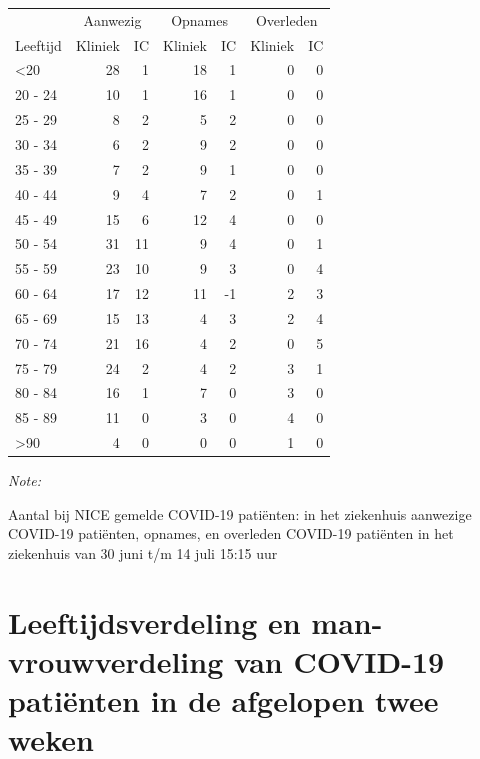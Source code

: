 \documentclass[
  english,
  man,floatsintext]{apa6}
\begin{document}
\begin{table}
\centering\begingroup\fontsize{10}{12}\selectfont

\begin{threeparttable}
\begin{tabular}{lrrrrrr}
\toprule
\multicolumn{1}{c}{ } & \multicolumn{2}{c}{Aanwezig} & \multicolumn{2}{c}{Opnames} & \multicolumn{2}{c}{Overleden} \\
\cmidrule(l{3pt}r{3pt}){2-3} \cmidrule(l{3pt}r{3pt}){4-5} \cmidrule(l{3pt}r{3pt}){6-7}
Leeftijd & Kliniek & IC & Kliniek & IC & Kliniek & IC\\
\midrule
<20 & 28 & 1 & 18 & 1 & 0 & 0\\
20 - 24 & 10 & 1 & 16 & 1 & 0 & 0\\
25 - 29 & 8 & 2 & 5 & 2 & 0 & 0\\
30 - 34 & 6 & 2 & 9 & 2 & 0 & 0\\
35 - 39 & 7 & 2 & 9 & 1 & 0 & 0\\
40 - 44 & 9 & 4 & 7 & 2 & 0 & 1\\
45 - 49 & 15 & 6 & 12 & 4 & 0 & 0\\
50 - 54 & 31 & 11 & 9 & 4 & 0 & 1\\
55 - 59 & 23 & 10 & 9 & 3 & 0 & 4\\
60 - 64 & 17 & 12 & 11 & -1 & 2 & 3\\
65 - 69 & 15 & 13 & 4 & 3 & 2 & 4\\
70 - 74 & 21 & 16 & 4 & 2 & 0 & 5\\
75 - 79 & 24 & 2 & 4 & 2 & 3 & 1\\
80 - 84 & 16 & 1 & 7 & 0 & 3 & 0\\
85 - 89 & 11 & 0 & 3 & 0 & 4 & 0\\
>90 & 4 & 0 & 0 & 0 & 1 & 0\\
\bottomrule
\end{tabular}
\begin{tablenotes}
\item \textit{Note: } 
\item Aantal bij NICE gemelde COVID-19 patiënten: in het ziekenhuis aanwezige COVID-19 patiënten, opnames, en overleden COVID-19 patiënten in het ziekenhuis van 30 juni t/m 14 juli 15:15 uur
\end{tablenotes}
\end{threeparttable}
\endgroup{}
\end{table}

\newpage

\hypertarget{leeftijdsverdeling-en-man-vrouwverdeling-van-covid-19-patiuxebnten-in-de-afgelopen-twee-weken}{%
\section{Leeftijdsverdeling en man-vrouwverdeling van COVID-19 patiënten in de afgelopen twee weken}\label{leeftijdsverdeling-en-man-vrouwverdeling-van-covid-19-patiuxebnten-in-de-afgelopen-twee-weken}}
\end{document}
